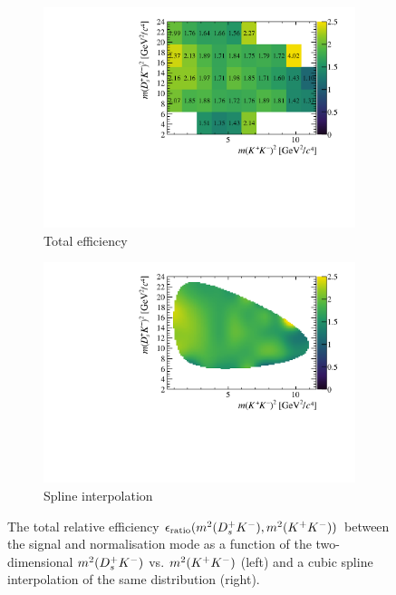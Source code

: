 \begin{figure}[!h]
   \centering
   \begin{subfigure}[t]{0.45\textwidth}
      \includegraphics[width=1.0\textwidth]{figs/B2DsKK/Full_Eff_Hist_All.pdf}
      \caption{Total efficiency}
      \label{fig:B2DsKK_eff_total_hist}
   \end{subfigure}
   \begin{subfigure}[t]{0.45\textwidth}
      \includegraphics[width=1.0\textwidth]{figs/B2DsKK/Full_Eff_Spline_All_withLimit.pdf}
      \caption{Spline interpolation}
      \label{fig:B2DsKK_eff_total_spline}
   \end{subfigure}
   \caption{The total relative efficiency $\epsilon_{\text{ratio}}(m^{2}({{D}^+_{s}}{{K}^-}),m^{2}({{K}^+}{{K}^-}))$ between the signal and normalisation mode as a function of the two-dimensional $m^{2}({{D}^+_{s}}{{K}^-})$ vs. $m^{2}({{K}^+}{{K}^-})$ (left) and a cubic spline interpolation of the same distribution (right).}
   \label{fig:B2DsKK_total_eff}
\end{figure}


